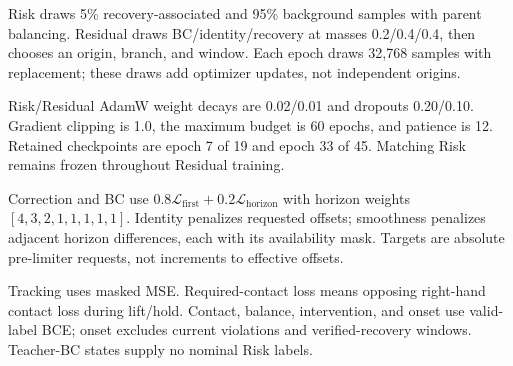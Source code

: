 \documentclass[letterpaper,10pt,conference]{ieeeconf}
\begin{document}
Risk draws 5\% recovery-associated and 95\% background samples with parent balancing. Residual draws BC/identity/recovery at masses 0.2/0.4/0.4, then chooses an origin, branch, and window. Each epoch draws 32,768 samples with replacement; these draws add optimizer updates, not independent origins.

Risk/Residual AdamW weight decays are 0.02/0.01 and dropouts 0.20/0.10. Gradient clipping is 1.0, the maximum budget is 60 epochs, and patience is 12. Retained checkpoints are epoch 7 of 19 and epoch 33 of 45. Matching Risk remains frozen throughout Residual training.

Correction and BC use $0.8\mathcal{L}_{\mathrm{first}}+0.2\mathcal{L}_{\mathrm{horizon}}$ with horizon weights $[4,3,2,1,1,1,1,1]$. Identity penalizes requested offsets; smoothness penalizes adjacent horizon differences, each with its availability mask. Targets are absolute pre-limiter requests, not increments to effective offsets.

Tracking uses masked MSE. Required-contact loss means opposing right-hand contact loss during lift/hold. Contact, balance, intervention, and onset use valid-label BCE; onset excludes current violations and verified-recovery windows. Teacher-BC states supply no nominal Risk labels.
\end{document}
